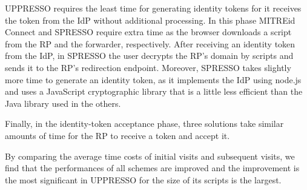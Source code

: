 UPPRESSO requires the least time for generating identity tokens for it receives the token from the IdP without additional processing.
In this phase MITREid Connect and SPRESSO require extra time as the browser downloads a script from the RP and the forwarder, respectively. %
After receiving an identity token from the IdP, in SPRESSO the user decrypts the RP's domain by scripts and sends it to the RP's redirection endpoint.
Moreover, SPRESSO takes slightly more time to generate an identity token, as it implements the IdP using node.js and uses a JavaScript cryptographic library that is a little less efficient than the Java library used in the others.

Finally, in the identity-token acceptance phase, 
three solutions take similar amounts of time for the RP to receive a token and accept it.


By comparing the average time costs of initial visits and subsequent visits,
    we find that the performances of all schemes are improved
        and the improvement is the most significant in UPPRESSO for the size of its scripts is the largest. 